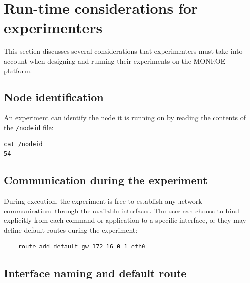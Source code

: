 \documentclass[a4paper,10pt]{article}
\newcommand{\VerbatimFont}{\footnotesize}
\newcommand{\monroe}{MONROE}
\newcommand{\identifier}[1]{{\texttt{\small{#1}}}}
\begin{document}

\section{Run-time considerations for experimenters}
\label{sec:experimentRuntime}

This section discusses several considerations that experimenters must take into account when designing and running their experiments on the \monroe{} platform.

\subsection{Node identification}
\label{subsec:nodeIdentification}

An experiment can identify the node it is running on by reading the contents of the \identifier{/nodeid} file:
{\VerbatimFont
\begin{verbatim}
cat /nodeid
54
\end{verbatim}}

\subsection{Communication during the experiment}
\label{subsec:communicationDuringExperiment}

During execution, the experiment is free to establish any network communications through the available interfaces.
The user can choose to bind explicitly from each command or application to a specific interface, or they may define default routes during the experiment:
{\VerbatimFont\begin{verbatim}
	route add default gw 172.16.0.1 eth0
\end{verbatim}}

\subsection{Interface naming and default route}
\label{subsec:interfaceNaming}
\end{document}

